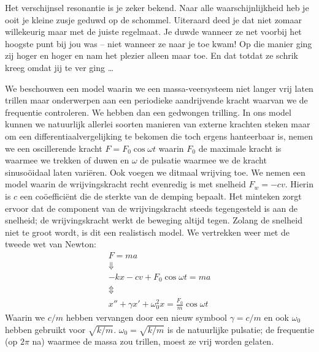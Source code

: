 \documentclass{ximera}
\begin{document}
	\author{Bart Lambregs}
    \xmsource




	
	Het verschijnsel resonantie is je zeker bekend. Naar alle waarschijnlijkheid heb je ooit je kleine zusje geduwd op de schommel. Uiteraard deed je dat niet zomaar willekeurig maar met de juiste regelmaat. Je duwde wanneer ze net voorbij het hoogste punt bij jou was -- niet wanneer ze naar je toe kwam! Op die manier ging zij hoger en hoger en nam het plezier alleen maar toe. En dat totdat ze schrik kreeg omdat jij te ver ging \ldots
	
	We beschouwen een model waarin we een massa-veersysteem niet langer vrij laten trillen maar onderwerpen aan een periodieke aandrijvende kracht waarvan we de frequentie controleren. We hebben dan een gedwongen trilling. In ons model kunnen we natuurlijk allerlei soorten manieren van externe krachten steken maar om een differentiaalvergelijking te bekomen die toch ergens hanteerbaar is, nemen we een oscillerende kracht $F=F_0\cos\omega t$ waarin $F_0$ de maximale kracht is waarmee we trekken of duwen en $\omega$ de pulsatie waarmee we de kracht sinusoöidaal laten variëren. Ook voegen we ditmaal wrijving toe. We nemen een model waarin de wrijvingskracht recht evenredig is met snelheid $F_w=-cv$. Hierin is $c$ een coöefficiënt die de sterkte van de demping bepaalt. Het minteken zorgt ervoor dat de component van de wrijvingskracht steeds tegengesteld is aan de snelheid; de wrijvingskracht werkt de beweging altijd tegen. Zolang de snelheid niet te groot wordt, is dit een realistisch model. We vertrekken weer met de tweede wet van Newton:
	\begin{gather}
	F=ma\nonumber\\
	\Downarrow\nonumber\\
	-kx-cv+F_0\cos\omega t=ma\nonumber\\
	\Updownarrow\nonumber\\
	x''+\gamma x'+\omega_0^2x=\frac{F_0}{m}\cos\omega t
	\end{gather}
	Waarin we $c/m$ hebben vervangen door een nieuw symbool $\gamma=c/m$ en ook $\omega_0$ hebben gebruikt voor $\sqrt{k/m}$. $\omega_0=\sqrt{k/m}$ is de natuurlijke pulsatie; de frequentie (op $2\pi$ na) waarmee de massa zou trillen, moest ze vrij worden gelaten.
	
\end{document}

